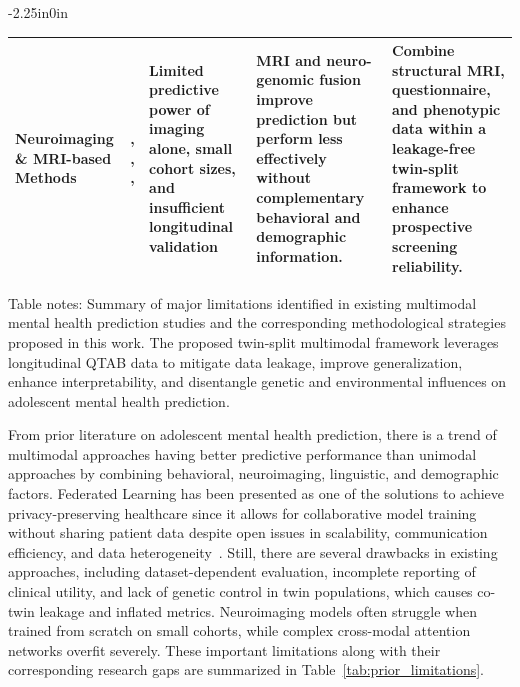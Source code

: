 \documentclass[10pt,letterpaper]{article}
\begin{document}
\begin{table}[!t]
\begin{adjustwidth}{-2.25in}{0in}
\begin{tabular}{|p{2.8cm}|p{2.0cm}|p{3.8cm}|p{4.5cm}|p{4.8cm}|}
Neuroimaging \& MRI-based Methods
& \cite{ref23}, \cite{ref24}, \cite{ref25}, \cite{ref27}
& Limited predictive power of imaging alone, small cohort sizes, and insufficient longitudinal validation
& MRI and neuro-genomic fusion improve prediction but perform less effectively without complementary behavioral and demographic information.
& Combine structural MRI, questionnaire, and phenotypic data within a leakage-free twin-split framework to enhance prospective screening reliability. \\
\hline

\end{tabular}

\begin{flushleft}
Table notes: Summary of major limitations identified in existing multimodal mental health prediction studies and the corresponding methodological strategies proposed in this work. The proposed twin-split multimodal framework leverages longitudinal QTAB data to mitigate data leakage, improve generalization, enhance interpretability, and disentangle genetic and environmental influences on adolescent mental health prediction.
\end{flushleft}

\end{adjustwidth}
\end{table}

From prior literature on adolescent mental health prediction, there is a trend of multimodal approaches having better predictive performance than unimodal approaches by combining behavioral, neuroimaging, linguistic, and demographic factors. Federated Learning has been presented as one of the solutions to achieve privacy-preserving healthcare since it allows for collaborative model training without sharing patient data despite open issues in scalability, communication efficiency, and data heterogeneity~\cite{ref66}. Still, there are several drawbacks in existing approaches, including dataset-dependent evaluation, incomplete reporting of clinical utility, and lack of genetic control in twin populations, which causes co-twin leakage and inflated metrics. Neuroimaging models often struggle when trained from scratch on small cohorts, while complex cross-modal attention networks overfit severely. These important limitations along with their corresponding research gaps are summarized in Table~\ref{tab:prior_limitations}.
\end{document}
